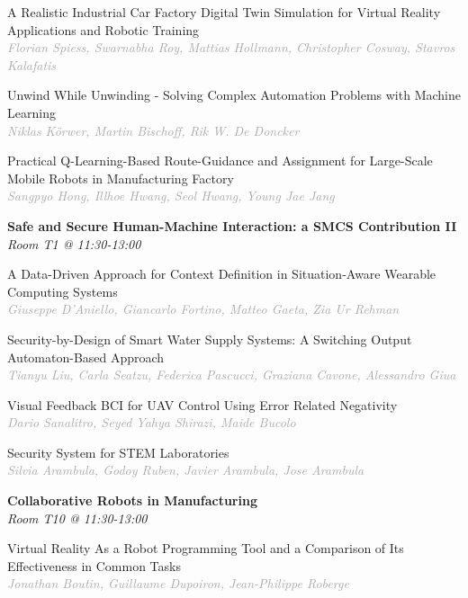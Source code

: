 \begin{multicols*}{2}
\small A Realistic Industrial Car Factory Digital Twin Simulation for Virtual Reality Applications and Robotic Training\\ 
\footnotesize \textcolor{darkgray}{\textit{Florian Spiess, Swarnabha  Roy, Mattias  Hollmann, Christopher  Cosway, Stavros  Kalafatis}}

\small Unwind While Unwinding - Solving Complex Automation Problems with Machine Learning\\ 
\footnotesize \textcolor{darkgray}{\textit{Niklas Körwer, Martin  Bischoff, Rik W.  De Doncker}}

\small Practical Q-Learning-Based Route-Guidance and Assignment for Large-Scale Mobile Robots in Manufacturing Factory\\ 
\footnotesize \textcolor{darkgray}{\textit{Sangpyo Hong, Illhoe  Hwang, Seol  Hwang, Young Jae  Jang}}

\normalsize \textbf{Safe and Secure Human-Machine Interaction: a SMCS Contribution II}\\
\small \textit{Room T1 @ 11:30-13:00}

\small A Data-Driven Approach for Context Definition in Situation-Aware Wearable Computing Systems\\ 
\footnotesize \textcolor{darkgray}{\textit{Giuseppe D'Aniello, Giancarlo  Fortino, Matteo  Gaeta, Zia Ur  Rehman}}

\small Security-by-Design of Smart Water Supply Systems: A Switching Output Automaton-Based Approach\\ 
\footnotesize \textcolor{darkgray}{\textit{Tianyu Liu, Carla  Seatzu, Federica  Pascucci, Graziana  Cavone, Alessandro  Giua}}

\small Visual Feedback BCI for UAV Control Using Error Related Negativity\\ 
\footnotesize \textcolor{darkgray}{\textit{Dario Sanalitro, Seyed Yahya  Shirazi, Maide  Bucolo}}

\small Security System for STEM Laboratories\\ 
\footnotesize \textcolor{darkgray}{\textit{Silvia Arambula, Godoy  Ruben, Javier  Arambula, Jose  Arambula}}

\normalsize \textbf{Collaborative Robots in Manufacturing}\\
\small \textit{Room T10 @ 11:30-13:00}

\small Virtual Reality As a Robot Programming Tool and a Comparison of Its Effectiveness in Common Tasks\\ 
\footnotesize \textcolor{darkgray}{\textit{Jonathan Boutin, Guillaume  Dupoiron, Jean-Philippe  Roberge}}


\end{multicols*}

